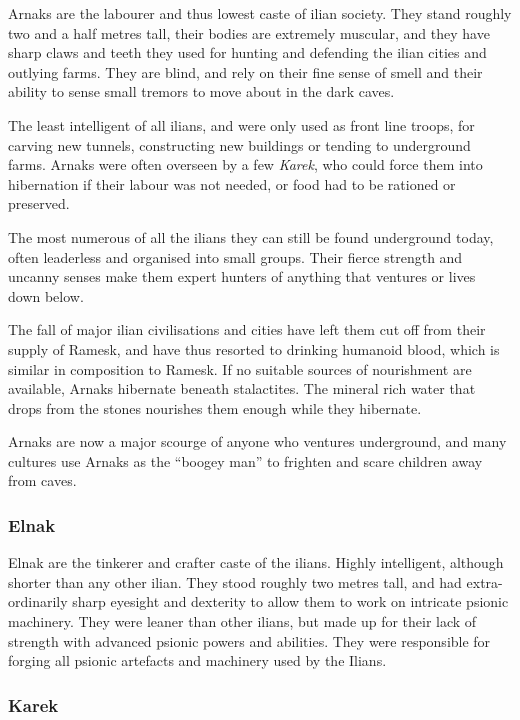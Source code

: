 Arnaks are the labourer and thus lowest caste of ilian society. They stand
roughly two and a half metres tall, their bodies are extremely muscular, and
they have sharp claws and teeth they used for hunting and defending the ilian
cities and outlying farms. They are blind, and rely on their fine sense of
smell and their ability to sense small tremors to move about in the dark caves.

The least intelligent of all ilians, and were only used as front line troops,
for carving new tunnels, constructing new buildings or tending to underground
farms. Arnaks were often overseen by a few \emph{Karek}, who could force them
into hibernation if their labour was not needed, or food had to be rationed or
preserved.

The most numerous of all the ilians they can still be found underground today,
often leaderless and organised into small groups. Their fierce strength and
uncanny senses make them expert hunters of anything that ventures or lives down
below.

The fall of major ilian civilisations and cities have left them cut off from
their supply of Ramesk, and have thus resorted to drinking humanoid blood,
which is similar in composition to Ramesk. If no suitable sources of nourishment
are available, Arnaks hibernate beneath stalactites. The mineral rich water
that drops from the stones nourishes them enough while they hibernate.

Arnaks are now a major scourge of anyone who ventures underground, and many
cultures use Arnaks as the ``boogey man'' to frighten and scare children away
from caves.

\subsubsection{Elnak}
\label{sec:Elnak}

Elnak are the tinkerer and crafter caste of the ilians. Highly intelligent,
although shorter than any other ilian. They stood roughly two metres tall, and
had extra-ordinarily sharp eyesight and dexterity to allow them to work on
intricate psionic machinery. They were leaner than other ilians, but made up
for their lack of strength with advanced psionic powers and abilities. They
were responsible for forging all psionic artefacts and machinery used by the
Ilians.

\subsubsection{Karek}
\label{sec:Karek}

